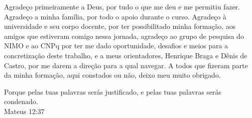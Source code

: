 \documentclass[
        12pt,
        openany, %
        oneside, %
        a4paper,			
        english,			
        brazil
        ]{abntbibufjf}
\begin{document}
\begin{agradecimentos}

Agradeço primeiramente a Deus, por tudo o que me deu e me permitiu fazer. Agradeço a minha família, por todo o apoio durante o curso. Agradeço à universidade e seu corpo docente, por ter possibilitado minha formação, aos amigos que estiveram comigo nessa jornada, agradeço ao grupo de pesquisa do NIMO e ao CNPq por ter me dado oportunidade, desafios e meios para a concretização deste trabalho, e a meus orientadores, Henrique Braga e Dênis de Castro, por me darem a direção para a qual navegar. A todos que fizeram parte da minha formação, aqui constados ou não, deixo meu muito obrigado.



\end{agradecimentos}

\begin{epigrafe}
    \vspace*{\fill}
	\begin{flushright}
		Porque pelas tuas palavras serás justificado, e pelas tuas palavras serás condenado.\\
		Mateus 12:37
	\end{flushright}
\end{epigrafe}


\end{document}
